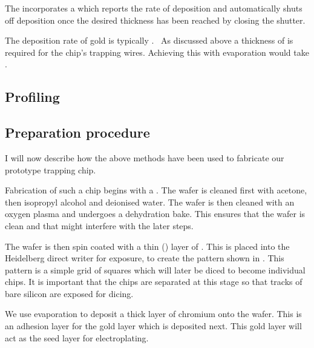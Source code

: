 
The  incorporates a  which reports the rate of
deposition and automatically shuts off deposition once the desired thickness
has been reached by closing the shutter. 

The deposition rate of gold is typically .~\cite{} As discussed above 
a thickness of  is required for the chip's trapping wires. Achieving
this with evaporation would take . 


\subsection{Profiling}
\label{fab:prep:profiling}


\subsection{Preparation procedure}
\label{fab:prep:procedure}

I will now describe how the above methods have been used to fabricate our
prototype trapping chip.

Fabrication of such a chip begins with a . The wafer
is cleaned first with acetone, then isopropyl alcohol and deionised water. The
wafer is then cleaned with an oxygen plasma and undergoes a dehydration bake.
This ensures that the wafer is clean and  that
might interfere with the later steps.

The wafer is then spin coated with a thin () layer of . This is placed into the Heidelberg direct writer for exposure, to
create the pattern shown in . This pattern is a simple grid of
 squares which will later be diced to become individual chips.
It is important that the chips are separated at this stage so that tracks of
bare silicon are exposed for dicing.

We use evaporation to deposit a  thick layer of chromium onto the
wafer. This is an adhesion layer for the  gold layer which is
deposited next. This gold layer will act as the seed layer for electroplating.

